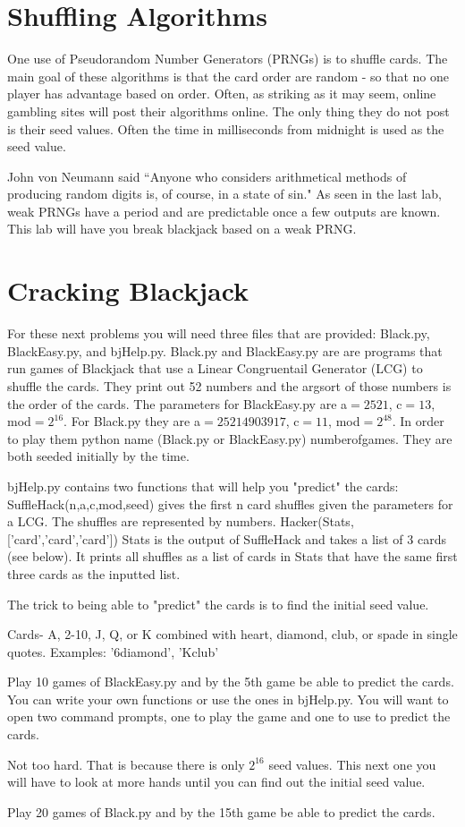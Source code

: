 \section*{Shuffling Algorithms}

One use of Pseudorandom Number Generators (PRNGs) is to shuffle cards.
The main goal of these algorithms is that the card order are random - so that no one player has advantage based on order.
Often, as striking as it may seem, online gambling sites will post their algorithms online.
The only thing they do not post is their seed values.
Often the time in milliseconds from midnight is used as the seed value.

John von Neumann said ``Anyone who considers arithmetical methods of producing random digits is, of course, in a state of sin."
As seen in the last lab, weak PRNGs have a period and are predictable once a few outputs are known.
This lab will have you break blackjack based on a weak PRNG.

\section*{Cracking Blackjack}
For these next problems you will need three files that are provided: Black.py, BlackEasy.py, and bjHelp.py.
Black.py and BlackEasy.py are are programs that run games of Blackjack that use a Linear Congruentail Generator (LCG) to shuffle the cards.
They print out 52 numbers and the argsort of those numbers is the order of the cards.
The parameters for BlackEasy.py are a$=2521$, c$=13$, mod$=2^{16}$.
For Black.py they are a$=25214903917$, c$=11$, mod$=2^{48}$.
In order to play them python name (Black.py or BlackEasy.py) numberofgames.
They are both seeded initially by the time.

bjHelp.py contains two functions that will help you "predict" the cards:
SuffleHack(n,a,c,mod,seed) gives the first n card shuffles given the parameters for a LCG.
The shuffles are represented by numbers.
Hacker(Stats,['card','card','card']) Stats is the output of SuffleHack and takes a list of 3 cards (see below).
It prints all shuffles as a list of cards in Stats that have the same first three cards as the inputted list.

The trick to being able to "predict" the cards is to find the initial seed value.

Cards- A, 2-10, J, Q, or K combined with heart, diamond, club, or spade in single quotes. Examples: '6diamond', 'Kclub'

\begin{problem}
Play 10 games of BlackEasy.py and by the 5th game be able to predict the cards.
You can write your own functions or use the ones in bjHelp.py.
You will want to open two command prompts, one to play the game and one to use to predict the cards. 
\end{problem}

Not too hard.
That is because there is only $2^{16}$ seed values.
This next one you will have to look at more hands until you can find out the initial seed value.

\begin{problem}
Play 20 games of Black.py and by the 15th game be able to predict the cards.
\end{problem}



